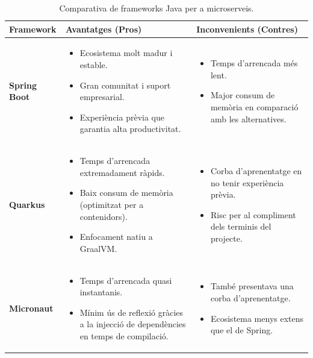\begin{table}[h]
\centering
\begin{tabular}{|l|p{5cm}|p{5cm}|}
\hline
\textbf{Framework} & \textbf{Avantatges (Pros)} & \textbf{Inconvenients (Contres)} \\
\hline
\textbf{Spring Boot} & 
\begin{itemize}
    \item Ecosistema molt madur i estable.
    \item Gran comunitat i suport empresarial.
    \item Experiència prèvia que garantia alta productivitat.
\end{itemize} & 
\begin{itemize}
    \item Temps d'arrencada més lent.
    \item Major consum de memòria en comparació amb les alternatives.
\end{itemize} \\
\hline
\textbf{Quarkus} & 
\begin{itemize}
    \item Temps d'arrencada extremadament ràpids.
    \item Baix consum de memòria (optimitzat per a contenidors).
    \item Enfocament natiu a GraalVM.
\end{itemize} & 
\begin{itemize}
    \item Corba d'aprenentatge en no tenir experiència prèvia.
    \item Risc per al compliment dels terminis del projecte.
\end{itemize} \\
\hline
\textbf{Micronaut} & 
\begin{itemize}
    \item Temps d'arrencada quasi instantanis.
    \item Mínim ús de reflexió gràcies a la injecció de dependències en temps de compilació.
\end{itemize} & 
\begin{itemize}
    \item També presentava una corba d'aprenentatge.
    \item Ecosistema menys extens que el de Spring.
\end{itemize} \\
\hline
\end{tabular}
\caption{Comparativa de frameworks Java per a microserveis.}
\label{tab:frameworks_backend}
\end{table}


